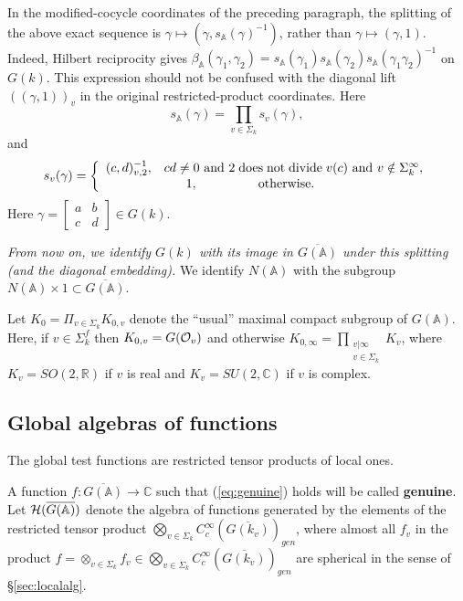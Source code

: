 \documentclass[12pt,letterpaper,openany]{book}
\theoremstyle{plain}
\theoremstyle{definition}
\theoremstyle{remark}
\theoremstyle{remark}
\begin{document}
In the modified-cocycle coordinates of the preceding paragraph, the
splitting of the above exact sequence is
$\gamma\longmapsto(\gamma,s_{\mathbb A}(\gamma)^{-1})$,
rather than $\gamma\longmapsto(\gamma,1)$.
Indeed, Hilbert reciprocity gives
$\beta_{\mathbb A}(\gamma_1,\gamma_2)
=s_{\mathbb A}(\gamma_1)s_{\mathbb A}(\gamma_2)
s_{\mathbb A}(\gamma_1\gamma_2)^{-1}$ on $G(k)$.
This expression should not be confused with the diagonal lift
$((\gamma,1))_v$ in the original restricted-product coordinates.
Here
\[
s_{{\mathbb{A}}}(\gamma )=
\prod_{v\in \Sigma _k}
s_v(\gamma),
\]
and
\begin{equation}\label{eq:sv}
s_v(\gamma)=\left\{
\begin{array}{c}
(c,d)_{v,2}^{-1},
\;\;\;cd\neq 0{\rm \ and\ }
2\;\mathrm{does\;not\;divide}\;v(c)
{\rm \ and\ }v\notin \Sigma_k^\infty, \\
1,\;\;\;\;\;\;\;\;\;\;\;\;\;\;\;\;
\mathrm{\;otherwise}.\;\;\;\;\;\;\;\;
\end{array}
\right.
\end{equation}
Here $\gamma =\left[
\begin{array}{cc}
a & b \\
c & d
\end{array}
\right] \in G(k)$.

{\em From now on, we identify $G(k)$ with its image
in $\overline{G({\mathbb{A}})}$ under this splitting (and the diagonal
embedding).} We identify $N({\mathbb{A}})$ with the
subgroup $N({\mathbb{A}})\times 1\subset \overline{G({\mathbb{A}})}$.

Let $K_0=\Pi_{v\in \Sigma_k}K_{0,v}$
denote the ``usual'' maximal compact subgroup of $G({\mathbb{A}})$.
Here, if $v\in \Sigma_k^f $ then $K_{0,v}=G({\cal O}_v)$ and
otherwise
$K_{0,\infty}=\prod_{\substack{ v|\infty\\ v\in\Sigma_k}}
K_v$, where $K_v=SO(2,{\mathbb{R}})$ if $v$ is real and
$K_v=SU(2,{\mathbb{C}})$ if $v$ is complex.

\subsection{Global algebras of functions}\label{sec:globalalg}

The global test functions are restricted tensor products of local ones.


A function $f:\overline{G({\mathbb{A}})}\rightarrow {\mathbb{C}}$
such that (\ref{eq:genuine})
holds will be called \textbf{genuine}. Let
${\cal{H}}(\overline{G({\mathbb{A}})})$ denote the algebra of
functions generated by the elements of the
restricted tensor product
$\bigotimes_{v\in \Sigma_k }
C_c^\infty (\overline{G(k_v)})_{gen}$,
where almost all $f_v$ in the product
$f=\otimes _{v\in \Sigma_k}f_v\in
\bigotimes_{v\in \Sigma_k }C_c^\infty (\overline{G(k_v)})_{gen}$ are
spherical in the sense of \S\ref{sec:localalg}.
\end{document}
